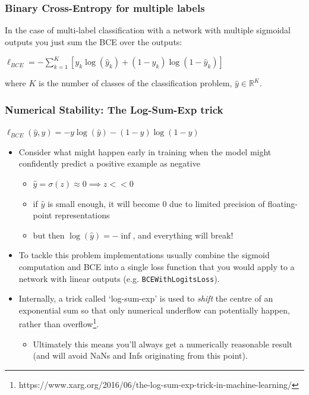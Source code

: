 \documentclass[\beamerclass]{beamer}
\begin{document}
\begin{frame}[fragile]\frametitle{Binary Cross-Entropy for multiple labels}

In the case of multi-label classification with a network with multiple sigmoidal outputs you just sum the BCE over the outputs:

\begin{center}
  $\ell_{BCE} = -\sum_{k = 1}^K [y_k \log (\hat y_k) + (1 - y_k) \log (1 - \hat y_k)] $ \\  
\end{center}

where $K$ is the number of classes of the classification problem, $\hat y \in \mathbb{R}^K$.
\end{frame}

\begin{frame}[fragile]\frametitle{Numerical Stability: The Log-Sum-Exp trick}
\begin{center}
$\ell_{BCE}(\hat y, y) = -y \log(\hat y) - (1 - y) \log (1 - \hat y)$  
\end{center}

\begin{itemize}
  \item Consider what might happen early in training when the model might confidently predict a positive example as negative
  \begin{itemize}
    \item<+-> $\hat y = \sigma(z) \approx 0 \implies z<<0$
    \item<+-> if $\hat y$ is small enough, it will become $0$ due to limited precision of floating-point representations
    \item<+-> but then $\log(\hat y) = -\inf$, and everything will break!
  \end{itemize}
  \item<+-> To tackle this problem implementations usually combine the sigmoid computation and BCE into a single loss function that you would apply to a network with linear outputs (e.g. \texttt{BCEWithLogitsLoss}).
  \item<+-> Internally, a trick called `log-sum-exp' is used to \emph{shift} the centre of an exponential sum so that only numerical underflow can potentially happen, rather than overflow\footnote{https://www.xarg.org/2016/06/the-log-sum-exp-trick-in-machine-learning/}.
  \begin{itemize}
    \item Ultimately this means you'll always get a numerically reasonable result (and will avoid NaNs and Infs originating from this point).
  \end{itemize}
\end{itemize}

\end{frame}
\end{document}
